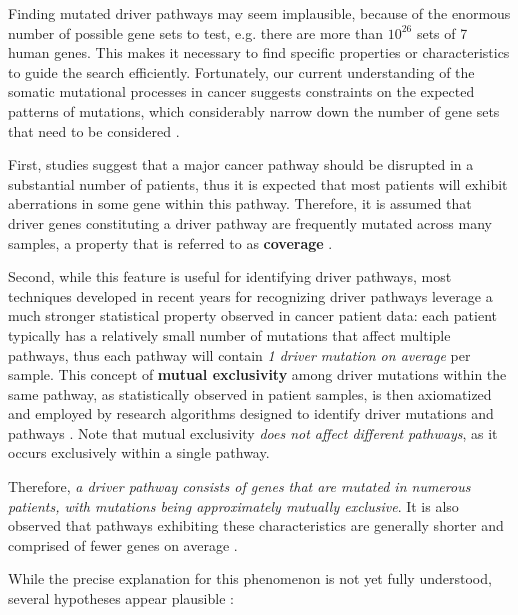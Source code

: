 Finding mutated driver pathways may seem implausible, because of the enormous number of possible gene sets to test, e.g. there are more than $10^{26}$ sets of 7 human genes. This makes it necessary to find specific properties or characteristics to guide the search efficiently. Fortunately, our current understanding of the somatic mutational processes in cancer suggests constraints on the expected patterns of mutations, which considerably narrow down the number of gene sets that need to be considered \cite{dendrix}.

First, studies suggest that a major cancer pathway should be disrupted in a substantial number of patients, thus it is expected that most patients will exhibit aberrations in some gene within this pathway. Therefore, it is assumed that driver genes constituting a driver pathway are frequently mutated across many samples, a property that is referred to as \textbf{coverage} \cite{dendrix}.

Second, while this feature is useful for identifying driver pathways, most techniques developed in recent years for recognizing driver pathways leverage a much stronger statistical property observed in cancer patient data: each patient typically has a relatively small number of mutations that affect multiple pathways, thus each pathway will contain \textit{1 driver mutation on average} per sample. This concept of \textbf{mutual exclusivity} among driver mutations within the same pathway, as statistically observed in patient samples, is then axiomatized and employed by research algorithms designed to identify driver mutations and pathways \cite{multi-dendrix}. Note that mutual exclusivity \textit{does not affect different pathways}, as it occurs exclusively within a single pathway.

Therefore, \textit{a driver pathway consists of genes that are mutated in numerous patients, with mutations being approximately mutually exclusive}. It is also observed that pathways exhibiting these characteristics are generally shorter and comprised of fewer genes on average \cite{multi-dendrix}.

While the precise explanation for this phenomenon is not yet fully understood, several hypotheses appear plausible \cite{survey, mutual_exclusivity_expls, dendrix}:

